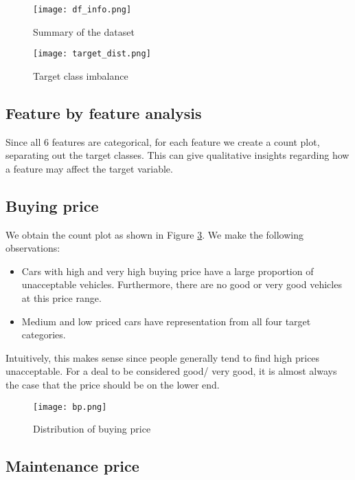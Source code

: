 \documentclass[conference]{IEEEtran}
\begin{document}
\begin{figure}[tbh]
\centering
\texttt{[image: df\_info.png]}
\caption{Summary of the dataset}
\label{df_info}
\end{figure}

\begin{figure}[tbh]
\centering
\texttt{[image: target\_dist.png]}
\caption{Target class imbalance}
\label{target_dist}
\end{figure}

\subsection{Feature by feature analysis}

Since all 6 features are categorical, for each feature we create a count plot, separating out the target classes. This can give qualitative insights regarding how a feature may affect the target variable. 

\subsection*{Buying price}

We obtain the count plot as shown in Figure \ref{bp}. We make the following observations:

\begin{itemize}
    \item Cars with high and very high buying price have a large proportion of unacceptable vehicles. Furthermore, there are no good or very good vehicles at this price range.
    \item Medium and low priced cars have representation from all four target categories.
\end{itemize}

Intuitively, this makes sense since people generally tend to find high prices unacceptable. For a deal to be considered good/ very good, it is almost always the case that the price should be on the lower end.

\begin{figure}[tbh]
\centering
\texttt{[image: bp.png]}
\caption{Distribution of buying price}
\label{bp}
\end{figure}

\subsection*{Maintenance price}
\end{document}
